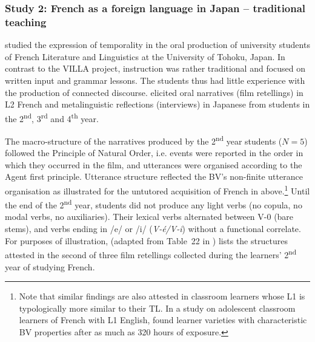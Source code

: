 \documentclass[output=paper]{langscibook}
\begin{document}
\subsubsection{Study 2: French as a foreign language in Japan – traditional teaching}\label{sec:benazzo:4.2.2}

\citet{Kerrou2019} studied the expression of temporality in the oral production of university students of French Literature and Linguistics at the University of Tohoku, Japan. In contrast to the VILLA project, instruction was rather traditional and focused on written input and grammar lessons. The students thus had little experience with the production of connected discourse. \citet{Kerrou2019} elicited oral narratives (film retellings) in L2 French and metalinguistic reflections (interviews) in Japanese from students in the 2\textsuperscript{nd}, 3\textsuperscript{rd} and 4\textsuperscript{th} year. 

The macro-structure of the narratives produced by the 2\textsuperscript{nd} year students ($N=5$) followed the Principle of Natural Order, i.e. events were reported in the order in which they occurred in the film, and utterances were organised according to the Agent first principle. Utterance structure reflected the BV’s non-finite utterance organisation as illustrated for the untutored acquisition of French in  above.\footnote{Note that similar findings are also attested in classroom learners whose L1 is typologically more similar to their TL. In a study on adolescent classroom learners of French with L1 English, \citet[106]{Granget2017} found learner varieties with characteristic BV properties after as much as 320 hours of exposure.} Until the end of the 2\textsuperscript{nd} year, students did not produce any light verbs (no copula, no modal verbs, no auxiliaries). Their lexical verbs alternated between V-0 (bare stems), and verbs ending in /e/ or /i/ (\textit{V-é/V-i}) without a functional correlate. For purposes of illustration,  (adapted from Table~22 in \citealt{Kerrou2019}) lists the structures attested in the second of three film retellings collected during the learners’ 2\textsuperscript{nd} year of studying French.
\end{document}
